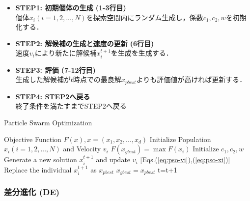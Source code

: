 \documentclass[a4j,11pt]{jarticle}
\begin{document}
\begin{itemize}
\item {\bf STEP1: 初期個体の生成 (1-3行目)}\\
個体$x_i (i=1,2,...,N)$を探索空間内にランダム生成し，係数$c_1,c_2, w$を初期化する．
\item {\bf STEP2: 解候補の生成と速度の更新 (6行目)}\\
速度$v_i$により新たに解候補$x_i^{t+1}$を生成を生成する．
\item {\bf STEP3: 評価 (7-12行目)}\\
生成した解候補が$t$時点での最良解$x_{pbest}$よりも評価値が高ければ更新する．
\item {\bf STEP4: STEP2へ戻る}\\
終了条件を満たすまでSTEP2へ戻る
\end{itemize}

\begin{algorithm}[H]
\caption{Particle Swarm Optimization}
\label{code:pso}
\begin{algorithmic}[2]
\REQUIRE Objective Function $F(x), x=(x_1,x_2,...,x_d)$
\STATE Initialize Population $x_i (i=1,2,...,N)$ and Velocity $v_i$
\STATE $F(x_{gbest})=\max{F(x_i)}$
\STATE Initialize $c_1,c_2,w$
\STATE Generate a new solution $x_i^{t+1}$ and update $v_i$ [Eqs.(\ref{eq:pso-vi}),(\ref{eq:pso-xi})]
\STATE Replace the individual $x_i^{t+1}$ as $x_{pbest}$
\ENDIF
{}
\STATE $x_{gbest}=x_{pbest}$
\ENDIF
\ENDFOR
\STATE t=t+1
\ENDWHILE
\end{algorithmic}
\end{algorithm}

\subsubsection{差分進化 (DE)}
\label{sss:DE}

\end{document}
